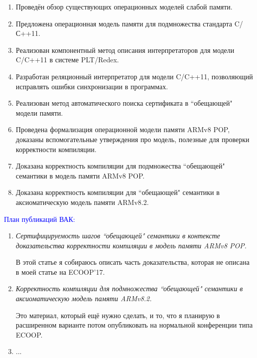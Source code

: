 {}
\begin{enumerate}
  \item Проведён обзор существующих операционных моделей слабой памяти.
  \item Предложена операционная модель памяти для подмножества стандарта C/С++11.
  \item Реализован компонентный метод описания интерпретаторов для модели C/C++11 в системе PLT/Redex.
  \item Разработан реляционный интерпретатор для модели C/C++11, позволяющий исправлять ошибки синхронизации
        в программах.
  \item Реализован метод автоматического поиска сертификата в ``обещающей" \; модели памяти.
  \item Проведена формализация операционной модели памяти ARMv8 POP, доказаны вспомогательные утверждения про
        модель, полезные для проверки корректности компиляции.
  \item Доказана корректность компиляции для подмножества ``обещающей" \; семантики в модель памяти ARMv8 POP.
  \item Доказана корректность компиляции для ``обещающей" \; семантики в аксиоматическую модель памяти ARMv8.2.
\end{enumerate}

\textcolor{blue}{План публикаций ВАК:}
\begin{enumerate}
  \item \textit{Сертифицируемость шагов ``обещающей" \; семантики в контексте доказательства корректности компиляции
    в модель памяти ARMv8 POP.}

    В этой статье я собираюсь описать часть доказательства, которая не описана в моей статье на ECOOP'17.

  \item \textit{Корректность компиляции для подмножества ``обещающей" \; семантики в аксиоматическую модель памяти ARMv8.2.}
  
    Это материал, который ещё нужно сделать, и то, что я планирую в расширенном варианте потом опубликовать
    на нормальной конференции типа ECOOP.
    
  \item ...
\end{enumerate}

